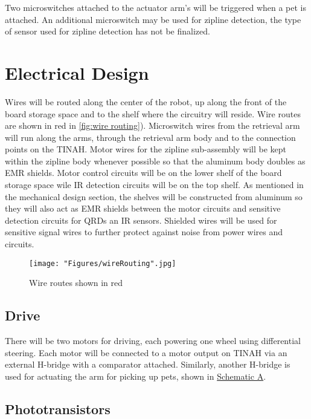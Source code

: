 \documentclass[11pt, oneside]{article} %
\begin{document}
	Two microswitches attached to the actuator arm's will be triggered when a pet is attached. An additional microswitch may be used for zipline detection, the type of sensor used for zipline detection has not be finalized.
	

\section{Electrical Design}

Wires will be routed along the center of the robot, up along the front of the board storage space and to the shelf where the circuitry will reside. Wire routes are shown in red in \autoref{fig:wire routing}). Microswitch wires from the retrieval arm will run along the arms, through the retrieval arm body and to the connection points on the TINAH. Motor wires for the zipline sub-assembly will be kept within the zipline body whenever possible so that the aluminum body doubles as EMR shields. Motor control circuits will be on the lower shelf of the board storage space wile IR detection circuits will be on the top shelf. As mentioned in the mechanical design section, the shelves will be constructed from aluminum so they will also act as EMR shields between the motor circuits and sensitive detection circuits for QRDs an IR sensors. Shielded wires will be used for sensitive signal wires to further protect against noise from power wires and circuits.

\begin{figure}[h]
	\centering
	\texttt{[image: "Figures/wireRouting".jpg]}
	\caption[Wire Routing]{Wire routes shown in red}
	\label{fig:wire routing}
\end{figure}

	\newpage
	\subsection{Drive}
	
	There will be two motors for driving, each powering one wheel using differential steering. Each motor will be connected to a motor output on TINAH via an external H-bridge with a comparator attached. Similarly, another H-bridge is used for actuating the arm for picking up pets, shown in \hyperref[sch:A]{Schematic A}.
	
	\subsection{Phototransistors}
	
\end{document}
